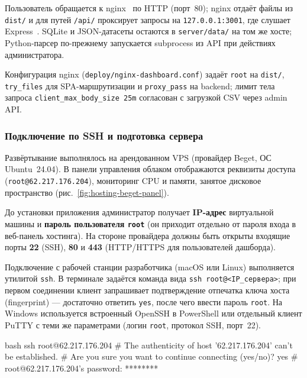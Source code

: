 Пользователь обращается к nginx~\cite{nginx} по HTTP (порт~80); nginx отдаёт файлы из \texttt{dist/} и для путей \texttt{/api/} проксирует запросы на \texttt{127.0.0.1:3001}, где слушает Express~\cite{express}. SQLite и JSON-датасеты остаются в \texttt{server/data/} на том же хосте; Python-парсер по-прежнему запускается subprocess из API при действиях администратора.

Конфигурация nginx (\texttt{deploy/nginx-dashboard.conf}) задаёт \texttt{root} на \texttt{dist/}, \texttt{try\_files} для SPA-маршрутизации и \texttt{proxy\_pass} на backend; лимит тела запроса \texttt{client\_max\_body\_size 25m} согласован с загрузкой CSV через admin API.

\subsubsection{Подключение по SSH и подготовка сервера}

Развёртывание выполнялось на арендованном VPS (провайдер Beget, ОС Ubuntu~24.04). В панели управления облаком отображаются реквизиты доступа (\texttt{root@62.217.176.204}), мониторинг CPU и памяти, занятое дисковое пространство (рис.~\ref{fig:hosting-beget-panel}).


До установки приложения администратор получает \textbf{IP-адрес} виртуальной машины и \textbf{пароль пользователя \texttt{root}} (он приходит отдельно от пароля входа в веб-панель хостинга). На стороне провайдера должны быть открыты входящие порты \textbf{22} (SSH), \textbf{80} и \textbf{443} (HTTP/HTTPS для пользователей дашборда).

Подключение с рабочей станции разработчика (macOS или Linux) выполняется утилитой \texttt{ssh}. В терминале задаётся команда вида \texttt{ssh root@<IP\_сервера>}; при первом соединении клиент запрашивает подтверждение отпечатка ключа хоста (fingerprint) --- достаточно ответить \texttt{yes}, после чего ввести пароль \texttt{root}. На Windows используется встроенный OpenSSH в PowerShell или отдельный клиент PuTTY с теми же параметрами (логин \texttt{root}, протокол SSH, порт~22).

\begin{singleminted}{bash}
ssh root@62.217.176.204
# The authenticity of host '62.217.176.204' can't be established.
# Are you sure you want to continue connecting (yes/no)? yes
# root@62.217.176.204's password: ********
\end{singleminted}
\label{lst:ssh-connect}

